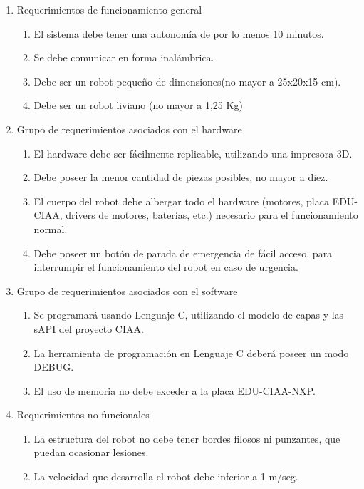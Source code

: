 \documentclass[11pt]{charter}
\begin{document}
\begin{enumerate}
\item Requerimientos de funcionamiento general
	\begin{enumerate}
	\item El sistema debe tener una autonomía de por lo menos 10 minutos.
	\item Se debe comunicar en forma inalámbrica. 
	\item Debe ser un robot pequeño de dimensiones(no mayor a 25x20x15 cm).
	\item Debe ser un robot liviano (no mayor a 1,25 Kg)
	\end{enumerate}
\item Grupo de requerimientos asociados con el hardware
	\begin{enumerate}
	\item El hardware debe ser fácilmente replicable, utilizando una impresora 3D.
	\item Debe poseer la menor cantidad de piezas posibles, no mayor a diez. 
	\item El cuerpo del robot debe albergar todo el hardware (motores, placa EDU-CIAA, drivers de motores, baterías, etc.) necesario para el funcionamiento normal.
	\item Debe poseer un botón de parada de emergencia de fácil acceso, para interrumpir el funcionamiento del robot en caso de urgencia.
	\end{enumerate}
\item Grupo de requerimientos asociados con el software
	\begin{enumerate}
	\item Se programará usando Lenguaje C, utilizando el modelo de capas y las sAPI del proyecto CIAA.
	\item La herramienta de programación en Lenguaje C deberá poseer un modo DEBUG.
	\item El uso de memoria no debe exceder a la placa EDU-CIAA-NXP.
	\end{enumerate}
\item Requerimientos no funcionales
	\begin{enumerate}
	\item La estructura del robot no debe tener bordes filosos ni punzantes, que puedan ocasionar lesiones. 
	\item La velocidad que desarrolla el robot debe inferior a 1 m/seg.
	\end{enumerate}
\end{enumerate}
\end{document}
